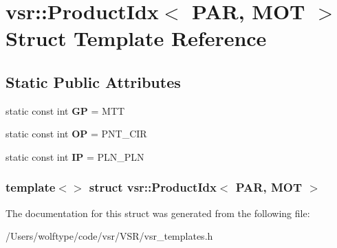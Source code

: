 \hypertarget{structvsr_1_1_product_idx_3_01_p_a_r_00_01_m_o_t_01_4}{\section{vsr\-:\-:Product\-Idx$<$ P\-A\-R, M\-O\-T $>$ Struct Template Reference}
\label{structvsr_1_1_product_idx_3_01_p_a_r_00_01_m_o_t_01_4}
}
\subsection*{Static Public Attributes}
\begin{DoxyCompactItemize}
\item 
\hypertarget{structvsr_1_1_product_idx_3_01_p_a_r_00_01_m_o_t_01_4_a7f0b226f02735e7cdc8bc5a9618bc6ca}{static const int {\bfseries G\-P} = M\-T\-T}\label{structvsr_1_1_product_idx_3_01_p_a_r_00_01_m_o_t_01_4_a7f0b226f02735e7cdc8bc5a9618bc6ca}

\item 
\hypertarget{structvsr_1_1_product_idx_3_01_p_a_r_00_01_m_o_t_01_4_aaab0cace76ed048739da99becdc39d86}{static const int {\bfseries O\-P} = P\-N\-T\-\_\-\-C\-I\-R}\label{structvsr_1_1_product_idx_3_01_p_a_r_00_01_m_o_t_01_4_aaab0cace76ed048739da99becdc39d86}

\item 
\hypertarget{structvsr_1_1_product_idx_3_01_p_a_r_00_01_m_o_t_01_4_ad36b22769ca6d966f8237e0d11009e22}{static const int {\bfseries I\-P} = P\-L\-N\-\_\-\-P\-L\-N}\label{structvsr_1_1_product_idx_3_01_p_a_r_00_01_m_o_t_01_4_ad36b22769ca6d966f8237e0d11009e22}

\end{DoxyCompactItemize}
\subsubsection*{template$<$$>$ struct vsr\-::\-Product\-Idx$<$ P\-A\-R, M\-O\-T $>$}



The documentation for this struct was generated from the following file\-:\begin{DoxyCompactItemize}
\item 
/\-Users/wolftype/code/vsr/\-V\-S\-R/vsr\-\_\-templates.\-h\end{DoxyCompactItemize}
